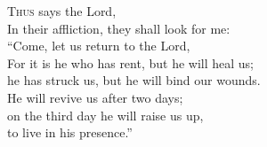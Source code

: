 \lettrine[loversize=0.15,lines=2]{T}{hus} says the Lord, \\In their affliction, they shall look for me:\\
   “Come, let us return to the Lord,\\
For it is he who has rent, but he will heal us;\\
   he has struck us, but he will bind our wounds.\\
He will revive us after two days;\\
   on the third day he will raise us up,\\
   to live in his presence.”
